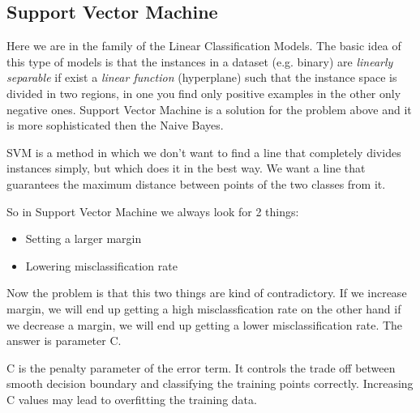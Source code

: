 \documentclass[12pt]{article}
\begin{document}
\subsection{Support Vector Machine}
Here we are in the family of the Linear Classification Models. The basic idea of this type of models is that the instances in a dataset (e.g. binary) are {\em linearly separable} if exist a {\em linear function} (hyperplane) such that the instance space is divided in two regions, in one you find only positive examples in the other only negative ones. Support Vector Machine is a solution for the problem above and it is more sophisticated then the Naive Bayes.

SVM is a method in which we don’t want to find a line that completely divides instances simply, but which does it in the best way. We want a line that guarantees the maximum distance between points of the two classes from it.

So in Support Vector Machine we always look for 2 things:
\begin{itemize}
\item Setting a larger margin
\item Lowering misclassification rate
\end{itemize}
Now the problem is that this two things are kind of contradictory. If we increase margin, we will end up getting a high misclassfication rate on the other hand if we decrease a margin, we will end up getting a lower misclassification rate. The answer is parameter C.

C is the penalty parameter of the error term. It controls the trade off between smooth decision boundary and classifying the training points correctly. Increasing C values may lead to overfitting the training data.
\end{document}
